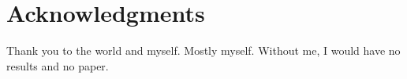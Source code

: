 \documentclass{ewass_ss4proc}
\begin{document}
\kant

\section*{Acknowledgments}
{Thank you to the world and myself. Mostly myself. Without me, I would have no results and no paper.}



\end{document}
